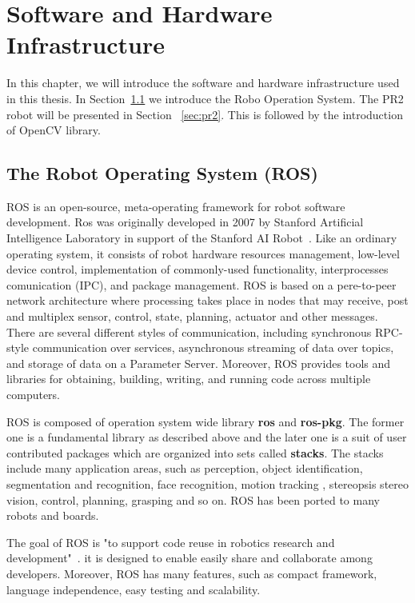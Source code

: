 \chapter{Software and Hardware Infrastructure}
\label{chapter:SHI}
In this chapter, we will introduce the software and hardware
infrastructure used in this thesis. In Section~\ref{sec:ros} we introduce the
Robo Operation System. The PR2 robot will be presented in Section
~\ref{sec:pr2}. This is followed by the introduction of OpenCV library.

\section{The Robot Operating System (ROS)}
\label{sec:ros}
ROS is an open-source, meta-operating framework for robot software
development. Ros was originally developed in 2007 by Stanford Artificial Intelligence Laboratory in support of the Stanford AI Robot~\cite{quigley2007stair}. Like an ordinary operating system, it consists of  robot
hardware resources management, low-level device control, implementation
of commonly-used functionality, interprocesses comunication (IPC), and package
management. ROS is based on a pere-to-peer network architecture where
processing takes place in nodes that may receive, post and 
multiplex sensor, control, state, planning, actuator and other
messages. There are several different styles of communication, including synchronous RPC-style communication over services, asynchronous
streaming of data over topics, and storage of data on a Parameter
Server.
Moreover, ROS provides tools and libraries for obtaining, building, writing, and
running code across multiple computers.

ROS is composed of operation system wide library \textbf{ros} and
\textbf{ros-pkg}. The former one is a fundamental library as described
above and the later one is a suit of user contributed packages which
are organized into sets called \textbf{stacks}. The stacks include
many application areas, such as  perception, object identification,
segmentation and recognition, face recognition, motion tracking ,
stereopsis stereo vision, control, planning, grasping and so on. ROS has been ported to many robots and boards.

The goal of ROS is "to support code reuse in robotics research and
development"~\cite{rosintroduction}.  it is designed to enable easily
share and collaborate among developers. Moreover, ROS has many
features, such as compact framework, language independence, easy
testing and scalability.

